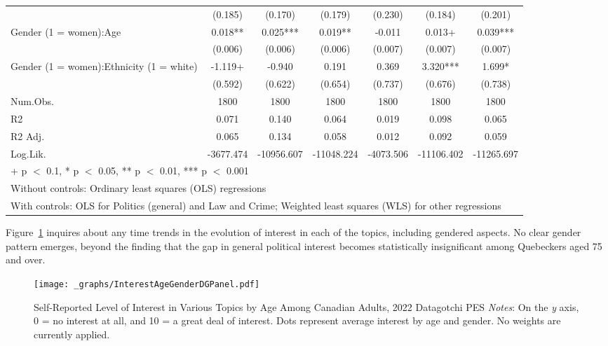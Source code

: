 \documentclass[
  letterpaper,
  DIV=11,
  numbers=noendperiod]{scrreprt}
\begin{document}
\begin{table}
\begin{tabular}[t]{lcccccc}
\hspace{1em} & (0.185) & (0.170) & (0.179) & (0.230) & (0.184) & (0.201)\\
\hspace{1em}Gender (1 = women):Age & 0.018** & 0.025*** & 0.019** & -0.011 & 0.013+ & 0.039***\\
\hspace{1em} & (0.006) & (0.006) & (0.006) & (0.007) & (0.007) & (0.007)\\
\hspace{1em}Gender (1 = women):Ethnicity (1 = white) & -1.119+ & -0.940 & 0.191 & 0.369 & 3.320*** & 1.699*\\
\hspace{1em} & (0.592) & (0.622) & (0.654) & (0.737) & (0.676) & (0.738)\\
\hspace{1em}Num.Obs. & 1800 & 1800 & 1800 & 1800 & 1800 & 1800\\
\hspace{1em}R2 & 0.071 & 0.140 & 0.064 & 0.019 & 0.098 & 0.065\\
\hspace{1em}R2 Adj. & 0.065 & 0.134 & 0.058 & 0.012 & 0.092 & 0.059\\
\hspace{1em}Log.Lik. & -3677.474 & -10956.607 & -11048.224 & -4073.506 & -11106.402 & -11265.697\\
\bottomrule
\multicolumn{7}{l}{\rule{0pt}{1em}+ p $<$ 0.1, * p $<$ 0.05, ** p $<$ 0.01, *** p $<$ 0.001}\\
\multicolumn{7}{l}{\rule{0pt}{1em}Without controls: Ordinary least squares (OLS) regressions}\\
\multicolumn{7}{l}{\rule{0pt}{1em}With controls: OLS for Politics (general) and Law and Crime; Weighted least squares (WLS) for other regressions}\\
\end{tabular}
\end{table}

Figure~\ref{fig-datagotchi} inquires about any time trends in the
evolution of interest in each of the topics, including gendered aspects.
No clear gender pattern emerges, beyond the finding that the gap in
general political interest becomes statistically insignificant among
Quebeckers aged 75 and over.

\begin{figure}

{\centering \texttt{[image: \_graphs/InterestAgeGenderDGPanel.pdf]}

}

\caption{\label{fig-datagotchi}Self-Reported Level of Interest in
Various Topics by Age Among Canadian Adults, 2022 Datagotchi PES
\newline \textit{Notes}: On the \textit{y} axis, 0 = no interest at all,
and 10 = a great deal of interest. Dots represent average interest by
age and gender. No weights are currently applied.}

\end{figure}
\end{document}
